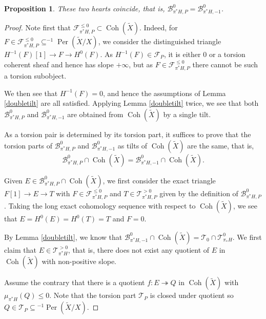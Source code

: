 \documentclass[12pt]{amsart}
\newtheorem{proposition}[theorem]{Proposition}
\theoremstyle{definition}
\DeclareMathOperator{\Coh}{Coh}
\DeclareMathOperator{\Per}{Per}
\begin{document}
\begin{proposition}\label{B0}
These two hearts coincide, that is, $\mathcal{B}^0_{\pi^\ast H,P}= \mathcal{B}^0_{\pi^\ast H,-1}$. 
\end{proposition}

\begin{proof}
Note first that $\mathcal{F}^{\leq 0}_{\pi^\ast H,P} \subset \Coh(\widetilde{X})$.
Indeed, for $F \in \mathcal{F}^{\leq 0}_{\pi^\ast H,P} \subseteq ^{-1}\Per(\widetilde{X}/X)$, 
we consider the distinguished triangle $H^{-1}(F)[1] \longrightarrow F \longrightarrow H^0(F)$.
As $H^{-1}(F) \in \mathcal{F}_P$, it is either $0$ or a torsion coherent sheaf and hence has slope $+\infty$, but as $F \in \mathcal{F}^{\leq 0}_{\pi^\ast H,P}$ there cannot be such a torsion subobject.

We then see that $H^{-1}(F) = 0$, and hence the assumptions of Lemma \ref{doubletilt} are all satisfied.
Applying Lemma \ref{doubletilt} twice, we see that both $\mathcal{B}^0_{\pi^\ast H,P}$ and $\mathcal{B}^0_{\pi^\ast H,-1}$ are obtained from $\Coh(\widetilde{X})$ by a single tilt. 

As a torsion pair is determined by its torsion part,
it suffices to prove that the torsion parts of $\mathcal{B}^0_{\pi^\ast H,P}$ and $\mathcal{B}^0_{\pi^\ast H,-1}$ as tilts of $\Coh(\widetilde{X})$ are the same, that is, 
\[\mathcal{B}^0_{\pi^\ast H,P} \cap \Coh(\widetilde{X}) = \mathcal{B}^0_{\pi^\ast H,-1} \cap \Coh(\widetilde{X}).\]


Given $E \in \mathcal{B}^0_{\pi^\ast H,P} \cap \Coh(\widetilde{X})$, we first consider the exact triangle $F[1] \longrightarrow E \longrightarrow T$ with $F \in \mathcal{F}^{\leq 0}_{\pi^\ast H,P}$ and $T \in \mathcal{T}^{>0}_{\pi^\ast H,P}$ given by the definition of $\mathcal{B}^0_{\pi^\ast H,P}$. 
Taking the long exact cohomology sequence with respect to $\Coh(\widetilde{X})$,
we see that $E = H^0(E) = H^0(T)=T$  and $F=0$.

By Lemma \ref{doubletilt}, we know that $\mathcal{B}^0_{\pi^\ast H,-1} \cap \Coh(\widetilde{X}) = \mathcal{T}_0 \cap \mathcal{T}^0_{\pi_\ast H}$.
We first claim that $E \in \mathcal{T}^{>0}_{\pi^\ast H}$, that is, there does not exist any quotient of $E$ in $\Coh(\widetilde{X})$ with non-positive slope.

Assume the contrary that there is a quotient $f \colon E \twoheadrightarrow Q$ in $\Coh(\widetilde{X})$ with $\mu_{\pi^\ast H}(Q) \leq 0$.
Note that the torsion part $\mathcal{T}_P$ is closed under quotient so $Q \in \mathcal{T}_P \subseteq {^{-1}\Per(\widetilde{X}/X)}$.


\end{proof}
\end{document}
